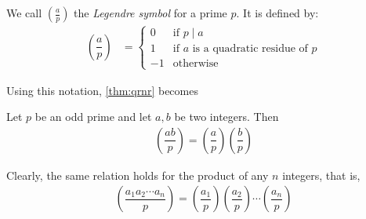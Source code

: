 \documentclass[main.tex]{subfile}
\begin{document}
	\begin{definition}
		We call $\left(\frac{a}{p}\right)$ the {\it Legendre symbol} for a prime $p$. It is defined by:
		\begin{align*}
			\left(\dfrac{a}{p}\right)
			& =
			\begin{cases}
				0 & \mbox{if }p\mid a\\
				1 &\mbox{if }a\mbox{ is a quadratic residue of }p\\
				-1 &\mbox{otherwise}
			\end{cases}
		\end{align*}

	\end{definition}

	Using this notation, \autoref{thm:qrnr} becomes
	\begin{theorem}\label{thm:qrproduct}
		Let $p$ be an odd prime and let $a,b$ be two integers. Then
		\begin{align*}
			\left(\dfrac{ab}{p}\right) = \left(\dfrac{a}{p}\right) \left(\dfrac{b}{p}\right)
		\end{align*}
	\end{theorem}

	\begin{remark}
		Clearly, the same relation holds for the product of any $n$ integers, that is,
		\begin{align*}
			\left(\dfrac{a_1a_2\cdots a_n}{p}\right) = \left(\dfrac{a_1}{p}\right) \left(\dfrac{a_2}{p}\right) \cdots \left(\dfrac{a_n}{p}\right)
		\end{align*}
	\end{remark}
\end{document}
